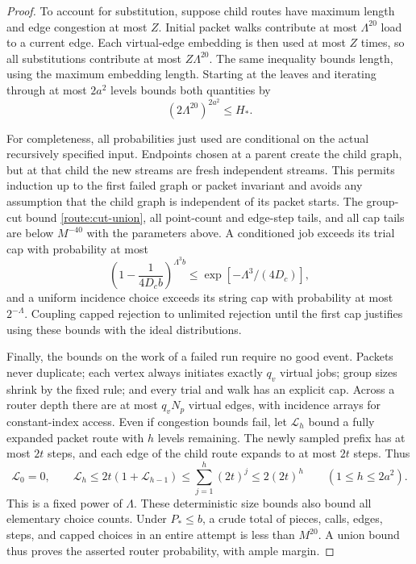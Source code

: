 \begin{proof}
To account for substitution, suppose child routes have maximum
length and edge congestion at most $Z$.  Initial packet walks
contribute at most $\Lambda^{20}$ load to a current edge.
Each virtual-edge embedding is then used at most $Z$ times, so
all substitutions contribute at most $Z\Lambda^{20}$.
The same inequality bounds length, using the maximum embedding
length.  Starting at the leaves and iterating through at most
$2a^2$ levels bounds both quantities by
\begin{equation}\label{route:substitution}
 (2\Lambda^{20})^{2a^2}\le H_*.
\end{equation}

For completeness, all probabilities just used are conditional on
the actual recursively specified input.  Endpoints chosen at a
parent create the child graph, but at that child the new streams
are fresh independent streams.  This permits induction up to the
first failed graph or packet invariant and avoids any assumption
that the child graph is independent of its packet starts.
The group-cut bound \eqref{route:cut-union}, all point-count and
edge-step tails, and all cap tails are below $M^{-40}$ with the
parameters above.  A conditioned job exceeds its trial cap with
probability at most
\[
 \left(1-\frac{1}{4D_cb}\right)^{\Lambda^3b}
       \le\exp[-\Lambda^3/(4D_c)],
\]
and a uniform incidence choice exceeds its string cap with
probability at most $2^{-\Lambda}$.  Coupling capped rejection to
unlimited rejection until the first cap justifies using these
bounds with the ideal distributions.

Finally, the bounds on the work of a failed run require no good
event.  Packets never duplicate; each vertex always initiates
exactly $q_v$ virtual jobs; group sizes shrink by the fixed rule;
and every trial and walk has an explicit cap.  Across a router
depth there are at most $q_vN_p$ virtual edges, with incidence
arrays for constant-index access.  Even if congestion bounds fail,
let $\mathcal L_h$ bound a fully expanded packet route with $h$ levels remaining.
The newly sampled prefix has at most $2t$ steps, and each edge of the
child route expands to at most $2t$ steps.  Thus
\[
 \mathcal L_0=0,\qquad \mathcal L_h\le2t(1+\mathcal L_{h-1})
       \le\sum_{j=1}^{h}(2t)^j\le2(2t)^h
       \qquad(1\le h\le2a^2).
\]
This is a fixed power of $\Lambda$.  These deterministic size bounds also bound
all elementary choice counts.  Under $P_*\le b$, a crude total
of pieces, calls, edges, steps, and capped choices in an entire
attempt is less than $M^{20}$.  A union bound thus proves the
asserted router probability, with ample margin.
\end{proof}

